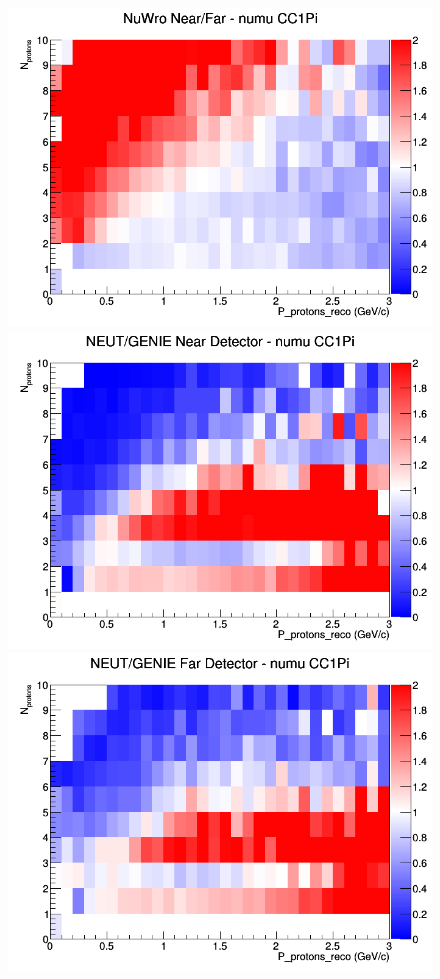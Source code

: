 \begin{figure}[h]
\endminipage
{}
\includegraphics[width=\linewidth]{eff_N_P/GAr/protons/ratios/CC1Pi_NuWro_numu_NF_N_P.png}
\endminipage
\newline
{}
\includegraphics[width=\linewidth]{eff_N_P/GAr/protons/ratios/CC1Pi_NEUT_GENIE_numu_near_N_P.png}
\endminipage
{}
\includegraphics[width=\linewidth]{eff_N_P/GAr/protons/ratios/CC1Pi_NEUT_GENIE_numu_far_N_P.png}

\end{figure}
